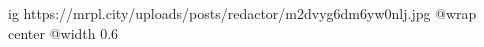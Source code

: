  
 
 
 
 

\ifcmt
  ig https://mrpl.city/uploads/posts/redactor/m2dvyg6dm6yw0nlj.jpg
  @wrap center
  @width 0.6
\fi
